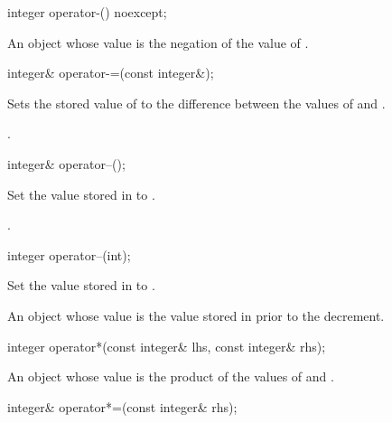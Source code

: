 \begin{itemdecl}
integer operator-() noexcept;	
\end{itemdecl}

\begin{itemdescr}
\returns An object whose value is the negation of the value of .		
\end{itemdescr}

\begin{itemdecl}
integer& operator-=(const integer&);	
\end{itemdecl}

\begin{itemdescr}
\effects Sets the stored value of  to the difference between the values of  and .

\returns {}.		
\end{itemdescr}

\begin{itemdecl}
integer& operator--();	
\end{itemdecl}

\begin{itemdescr}
\effects Set the value stored in  to .

\returns {}.		
\end{itemdescr}

\begin{itemdecl}
integer operator--(int);	
\end{itemdecl}

\begin{itemdescr}
\effects Set the value stored in  to .

\returns An object whose value is the value stored in  prior to the decrement.		
\end{itemdescr}

\begin{itemdecl}
integer operator*(const integer& lhs, const integer& rhs);	
\end{itemdecl}

\begin{itemdescr}
\returns An object whose value is the product of the values of  and .		
\end{itemdescr}

\begin{itemdecl}
integer& operator*=(const integer& rhs);	
\end{itemdecl}

